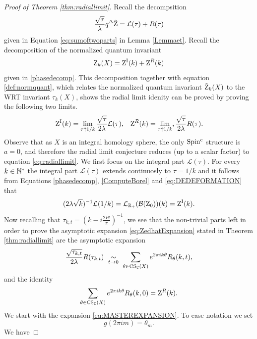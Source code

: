 \begin{proof}[Proof of Theorem \ref{thm:radiallimit}]
	
 Recall the decompsition
	$$\frac{\sqrt{\tau}}{\lambda}q^{\Delta}\hat{\operatorname{Z}}=\mathcal{L}(\tau)+R(\tau)$$ given in Equation \eqref{eq:sumoftwoparts} in Lemma \ref{Lemmaet}. Recall the decomposition of the normalized quantum invariant
	$$\operatorname{Z}_k(X)= \operatorname{Z}^{\operatorname{I}}(k)+\operatorname{Z}^R(k)$$ given in \eqref{phasedecomp}. This decomposition together with equation \eqref{def:normquant}, which relates the normalized quantum invariant $\tilde{\operatorname{Z}}_k(X)$ to the WRT invariant $\tau_k(X)$, shows the radial limit idenity can be proved by proving the following two limits. 
	\begin{align} & \operatorname{Z}^{\operatorname{I}}(k) = \lim_{\tau \uparrow 1/k} \frac{\sqrt{\tau}}{2\lambda} \mathcal{L}(\tau),
 & \operatorname{Z}^R(k) = \lim_{\tau \uparrow 1/k}, \frac{\sqrt{\tau}}{2\lambda}R(\tau).\end{align}  
 Observe that as $X$ is an integral homology sphere, the only $\operatorname{Spin^c}$ structure is $a=0$, and therefore the radial limit conjecture  reduces (up to a scalar factor) to equation \eqref{eq:radiallimit}.  We first focus on the integral part $\mathcal{L}(\tau)$. For every $k\in \mathbb{N}^*$ the integral part  $\mathcal{L}(\tau)$ extends continuosly to $\tau=1/k$ and it follows from Equations \eqref{phasedecomp}, \eqref{ComputeBorel} and \eqref{eq:DEDEFORMATION}  that 
		\begin{equation}
		(2\lambda \sqrt{k})^{-1} \mathcal{L}(1/k)= \mathcal{L}_{\mathbb{R}_+}(\mathcal{B}(\operatorname{Z}_0))(k)=\operatorname{Z}^{\operatorname{I}}(k).
		\end{equation}
		Now recalling that $\tau_{k,t}=(k-i\frac{2Pt}{\pi})^{-1}$, we see that the non-trivial parts left in order to prove  the asymptotic expansion \eqref{eq:ZedhatExpansion} stated in Theorem \ref{thm:radiallimit} are the asymptotic expansion 
		\begin{equation} \label{eq:MASTEREXPANSION}
		\frac{\sqrt{\tau_{k,t}}}{2\lambda} R(\tau_{k,t}) \ \underset{ t \rightarrow 0}{\sim} \ \sum_{\theta \in \operatorname{CS}_{\mathbb{C}}(X)} e^{2\pi ik\theta} R_{\theta}(k,t),
		\end{equation} 
		and the identity
		\begin{equation} \label{eq:FINALIDENTITY} \sum_{\theta \in \operatorname{CS}_{\mathbb{C}}(X)} e^{2\pi ik\theta} R_{\theta}(k,0)= \operatorname{Z}^{R}(k).
		\end{equation}
We start with the expansion \eqref{eq:MASTEREXPANSION}. To ease notation we set
\begin{equation}
g(2\pi im)=\theta_m.
\end{equation} We have

\end{proof}
